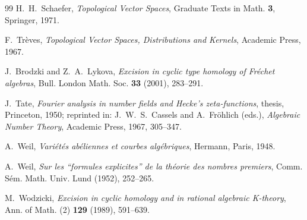 \documentclass[11pt]{amsart}
\theoremstyle{definition}
\theoremstyle{remark}
\begin{document}
\begin{thebibliography}{99}
H.~H.~Schaefer, \emph{Topological Vector Spaces}, Graduate Texts in Math.
\textbf{3}, Springer, 1971.

F.~Tr\`eves, \emph{Topological Vector Spaces, Distributions and Kernels},
Academic Press, 1967.

J.~Brodzki and Z.~A.~Lykova, \emph{Excision in cyclic type homology of
Fr\'echet algebras}, Bull. London Math. Soc. \textbf{33} (2001), 283--291.

J.~Tate, \emph{Fourier analysis in number fields and Hecke's zeta-functions},
thesis, Princeton, 1950; reprinted in: J.~W.~S.~Cassels and A.~Fr\"ohlich
(eds.), \emph{Algebraic Number Theory}, Academic Press, 1967, 305--347.

A.~Weil, \emph{Vari\'et\'es ab\'eliennes et courbes alg\'ebriques}, Hermann,
Paris, 1948.

A.~Weil, \emph{Sur les ``formules explicites'' de la th\'eorie des nombres
premiers}, Comm. S\'em. Math. Univ. Lund (1952), 252--265.

M.~Wodzicki, \emph{Excision in cyclic homology and in rational algebraic
K-theory}, Ann. of Math. (2) \textbf{129} (1989), 591--639.

\end{thebibliography}
\end{document}
